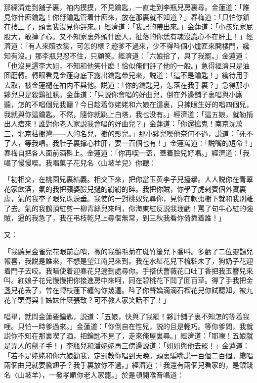 那經濟走到舖子裏，袖内摸摸，不見鑰匙，一直走到李瓶兒房裏尋。金蓮道：「誰見你什麽鑰匙！你㧱鑰匙管着什麽來，放在那裏就不知道？」春梅道：「只怕你鎖在樓上了，頭裏我沒見你㧱來。」經濟道：「我記的帶出來。」金蓮道：「小孩兒家屁股大，敢掉了心。又不知家裏外頭什麽人，扯落的你恁有魂沒識心不在肝上！」經濟道：「有人來贖衣裳，可怎的樣？趂爹不過來，少不得呌個小爐匠來開樓門，纔知有沒。」那李瓶兒忍不住，只顧笑。經濟道：「六娘拾了，與了我罷。」金蓮道：「也沒見這李大姐，不知和他笑什麽！恰似俺們㧱了他的一般。」急得經濟只是油囬磨轉。轉眼看見金蓮身底下露出鑰匙带兒來，説道：「這不是鑰匙！」纔待用手去取，被金蓮褪在袖内不與他。説道：「你的鑰匙兒，怎落在我手裏？」急得那小夥兒只是殺鷄扯膆。金蓮道：「只説你會唱的好曲兒，倒在外邊舖子裏唱與小廝聽，怎的不唱個兒我聽？今日趁着你姥姥和六娘在這裏，只揀眼生好的唱四個兒，我就與你這鑰匙。不然，隨你就跳上白塔，我也没有。」經濟道：「這五娘，就勒掯出人痞來！誰對你老人家説我會唱的好曲兒？」金蓮道：「你還搗鬼！南京沈萬三，北京枯樹灣——人的名兒，樹的影兒。」那小夥兒喫他奈何不過，説道：「死不了人，等我唱。我肚子裏撑心柱肝，要一百個也有！」金蓮罵道：「説嘴的短命！」春梅自把各人面前酒斟上。金蓮道：「你再喫一盃，蓋着臉兒好唱。」經濟道：「我唱了慢慢喫。我唱菓子花兒名〈山坡羊兒〉你聽：

「初相交，在桃園兒裏結義。相交下來，把你當玉黄李子兒擡擧。人人説你在青翠花家飲酒，氣的我把蘋婆臉兒撾的紛紛的碎。我把你賊，你學了虎剌賓個外實裏虚，氣的我李子眼兒珠淚垂。我使的一對桃奴兒尋你，見你在軟棗樹下就和我別離了去。氣的我鶴頂紅剪一柳青絲兒來呵，你海東紅反説我理虧！罵了句牛心紅的強賊，逼的我急了，我在弔枝乾兒上尋個無常，到三秋我看你倚靠着誰！」

又：

「我聽見金雀兒花眼前高哨，撇的我鵝毛菊在斑竹簾兒下喬呌。多虧了二位靈鵲兒報喜，我説是誰來，不想是望江南兒來到。我在水紅花兒下梳粧未了，狗奶子花迎着門子去咬。我暗使着迎春花兒遶到處尋你。手搭伏薔薇花口吐丁香把我玉簪兒來呌。紅娘子花兒慢慢把你接進房中來呵，同在碧桃花下鬦了囬百草。得了手我把金盞兒花丢了，曾在轉枝蓮下纏勾你幾遭。呌了你聲嬌滴滴石榴花兒你試聽知，被九花丫頭傳與十姊妹什麽張致？可不教人家笑話不了！」

唱畢，就問金蓮要鑰匙，説道：「五娘，快與了我罷！夥計舖子裏不知怎的等着我哩。只怕一時爹過來。」金蓮道：「你倒自在性兒，説的且是輕巧。等你爹問，我就説你不知在那裏喫了酒，把鑰匙不見了，走來俺屋裏尋。」經濟道：「耶嚛！五娘就是弄人的劊子手！」李瓶兒和潘姥姥再三傍邊説道：「姐姐與他去罷！」金蓮道：「若不是姥姥和你六娘勸我，定罰教你唱到天晚。頭裏騙嘴説一百個二百個。纔唱兩個曲兒就要騰翅子？我手裏放你不過。」經濟道：「我還有兩個兒看家的，是銀錢名〈山坡羊〉，一發孝順你老人家罷。」於是頓開喉音唱道：

